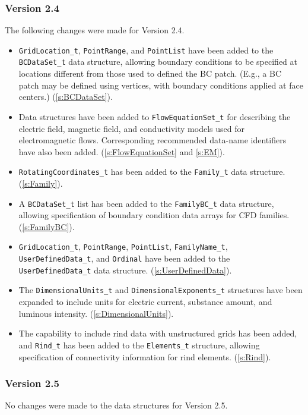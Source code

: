 \subsubsection{Version 2.4}
The following changes were made for Version 2.4.

\begin{itemize}
\item \texttt{GridLocation\_t}, \texttt{PointRange}, and \texttt{PointList}
      have been added to the \texttt{BCDataSet\_t} data structure,
      allowing boundary conditions to be specified at locations
      different from those used to defined the BC patch.
      (E.g., a BC patch may be defined using vertices, with boundary
      conditions applied at face centers.)
      (\autoref{s:BCDataSet}).
\item Data structures have been added to \texttt{FlowEquationSet\_t} for
      describing the electric field, magnetic field, and conductivity
      models used for electromagnetic flows.
      Corresponding recommended data-name identifiers have also been
      added.
      (\autoref{s:FlowEquationSet} and \autoref{s:EM}).
\item \texttt{RotatingCoordinates\_t} has been added to the
      \texttt{Family\_t} data structure.
      (\autoref{s:Family}).
\item A \texttt{BCDataSet\_t} list has been added to the
      \texttt{FamilyBC\_t} data structure, allowing specification of
      boundary condition data arrays for CFD families.
      (\autoref{s:FamilyBC}).
\item \texttt{GridLocation\_t}, \texttt{PointRange}, \texttt{PointList},
      \texttt{FamilyName\_t}, \texttt{UserDefinedData\_t}, and
      \texttt{Ordinal} have been added to the \texttt{UserDefinedData\_t}
      data structure.
      (\autoref{s:UserDefinedData}).
\item The \texttt{DimensionalUnits\_t} and \texttt{DimensionalExponents\_t}
      structures have been expanded to include units for electric
      current, substance amount, and luminous intensity.
      (\autoref{s:DimensionalUnits}).
\item The capability to include rind data with unstructured grids
      has been added, and \texttt{Rind\_t} has been added to the
      \texttt{Elements\_t} structure, allowing specification of
      connectivity information for rind elements.
      (\autoref{s:Rind}).
\end{itemize}

\subsubsection{Version 2.5}
No changes were made to the data structures for Version 2.5.


